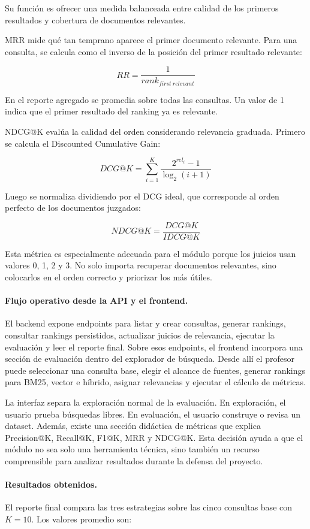\documentclass[11pt]{article}
\begin{document}
Su función es ofrecer una medida balanceada entre calidad de los primeros resultados y cobertura de documentos relevantes.

MRR mide qué tan temprano aparece el primer documento relevante. Para una consulta, se calcula como el inverso de la posición del primer resultado relevante:

\[
RR = \frac{1}{rank_{first\ relevant}}
\]

En el reporte agregado se promedia sobre todas las consultas. Un valor de 1 indica que el primer resultado del ranking ya es relevante.

NDCG@K evalúa la calidad del orden considerando relevancia graduada. Primero se calcula el Discounted Cumulative Gain:

\[
DCG@K = \sum_{i=1}^{K} \frac{2^{rel_i}-1}{\log_2(i+1)}
\]

Luego se normaliza dividiendo por el DCG ideal, que corresponde al orden perfecto de los documentos juzgados:

\[
NDCG@K = \frac{DCG@K}{IDCG@K}
\]

Esta métrica es especialmente adecuada para el módulo porque los juicios usan valores 0, 1, 2 y 3. No solo importa recuperar documentos relevantes, sino colocarlos en el orden correcto y priorizar los más útiles.

\paragraph{Flujo operativo desde la API y el frontend.}
El backend expone endpoints para listar y crear consultas, generar rankings, consultar rankings persistidos, actualizar juicios de relevancia, ejecutar la evaluación y leer el reporte final. Sobre esos endpoints, el frontend incorpora una sección de evaluación dentro del explorador de búsqueda. Desde allí el profesor puede seleccionar una consulta base, elegir el alcance de fuentes, generar rankings para BM25, vector e híbrido, asignar relevancias y ejecutar el cálculo de métricas.

La interfaz separa la exploración normal de la evaluación. En exploración, el usuario prueba búsquedas libres. En evaluación, el usuario construye o revisa un dataset. Además, existe una sección didáctica de métricas que explica Precision@K, Recall@K, F1@K, MRR y NDCG@K. Esta decisión ayuda a que el módulo no sea solo una herramienta técnica, sino también un recurso comprensible para analizar resultados durante la defensa del proyecto.

\paragraph{Resultados obtenidos.}
El reporte final compara las tres estrategias sobre las cinco consultas base con \(K=10\). Los valores promedio son:
\end{document}

